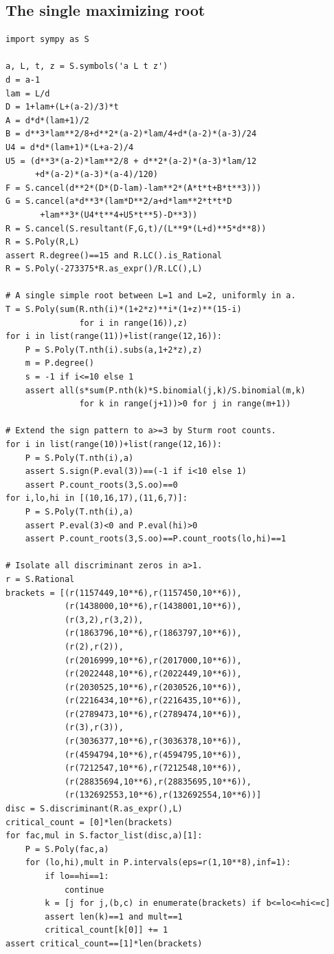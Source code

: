 \documentclass[11pt]{article}
\begin{document}
\subsection{The single maximizing root}
\begin{verbatim}
import sympy as S

a, L, t, z = S.symbols('a L t z')
d = a-1
lam = L/d
D = 1+lam+(L+(a-2)/3)*t
A = d*d*(lam+1)/2
B = d**3*lam**2/8+d**2*(a-2)*lam/4+d*(a-2)*(a-3)/24
U4 = d*d*(lam+1)*(L+a-2)/4
U5 = (d**3*(a-2)*lam**2/8 + d**2*(a-2)*(a-3)*lam/12
      +d*(a-2)*(a-3)*(a-4)/120)
F = S.cancel(d**2*(D*(D-lam)-lam**2*(A*t*t+B*t**3)))
G = S.cancel(a*d**3*(lam*D**2/a+d*lam**2*t*t*D
       +lam**3*(U4*t**4+U5*t**5)-D**3))
R = S.cancel(S.resultant(F,G,t)/(L**9*(L+d)**5*d**8))
R = S.Poly(R,L)
assert R.degree()==15 and R.LC().is_Rational
R = S.Poly(-273375*R.as_expr()/R.LC(),L)

# A single simple root between L=1 and L=2, uniformly in a.
T = S.Poly(sum(R.nth(i)*(1+2*z)**i*(1+z)**(15-i)
               for i in range(16)),z)
for i in list(range(11))+list(range(12,16)):
    P = S.Poly(T.nth(i).subs(a,1+2*z),z)
    m = P.degree()
    s = -1 if i<=10 else 1
    assert all(s*sum(P.nth(k)*S.binomial(j,k)/S.binomial(m,k)
               for k in range(j+1))>0 for j in range(m+1))

# Extend the sign pattern to a>=3 by Sturm root counts.
for i in list(range(10))+list(range(12,16)):
    P = S.Poly(T.nth(i),a)
    assert S.sign(P.eval(3))==(-1 if i<10 else 1)
    assert P.count_roots(3,S.oo)==0
for i,lo,hi in [(10,16,17),(11,6,7)]:
    P = S.Poly(T.nth(i),a)
    assert P.eval(3)<0 and P.eval(hi)>0
    assert P.count_roots(3,S.oo)==P.count_roots(lo,hi)==1

# Isolate all discriminant zeros in a>1.
r = S.Rational
brackets = [(r(1157449,10**6),r(1157450,10**6)),
            (r(1438000,10**6),r(1438001,10**6)),
            (r(3,2),r(3,2)),
            (r(1863796,10**6),r(1863797,10**6)),
            (r(2),r(2)),
            (r(2016999,10**6),r(2017000,10**6)),
            (r(2022448,10**6),r(2022449,10**6)),
            (r(2030525,10**6),r(2030526,10**6)),
            (r(2216434,10**6),r(2216435,10**6)),
            (r(2789473,10**6),r(2789474,10**6)),
            (r(3),r(3)),
            (r(3036377,10**6),r(3036378,10**6)),
            (r(4594794,10**6),r(4594795,10**6)),
            (r(7212547,10**6),r(7212548,10**6)),
            (r(28835694,10**6),r(28835695,10**6)),
            (r(132692553,10**6),r(132692554,10**6))]
disc = S.discriminant(R.as_expr(),L)
critical_count = [0]*len(brackets)
for fac,mul in S.factor_list(disc,a)[1]:
    P = S.Poly(fac,a)
    for (lo,hi),mult in P.intervals(eps=r(1,10**8),inf=1):
        if lo==hi==1:
            continue
        k = [j for j,(b,c) in enumerate(brackets) if b<=lo<=hi<=c]
        assert len(k)==1 and mult==1
        critical_count[k[0]] += 1
assert critical_count==[1]*len(brackets)


\end{verbatim}
\end{document}
